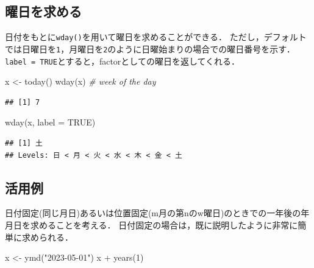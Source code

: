 \documentclass[
]{article}
\newenvironment{Shaded}{\begin{snugshade}}{\end{snugshade}}
\newcommand{\AttributeTok}[1]{\textcolor[rgb]{0.77,0.63,0.00}{#1}}
\newcommand{\CommentTok}[1]{\textcolor[rgb]{0.56,0.35,0.01}{\textit{#1}}}
\newcommand{\ConstantTok}[1]{\textcolor[rgb]{0.00,0.00,0.00}{#1}}
\newcommand{\DecValTok}[1]{\textcolor[rgb]{0.00,0.00,0.81}{#1}}
\newcommand{\FunctionTok}[1]{\textcolor[rgb]{0.00,0.00,0.00}{#1}}
\newcommand{\NormalTok}[1]{#1}
\newcommand{\OtherTok}[1]{\textcolor[rgb]{0.56,0.35,0.01}{#1}}
\newcommand{\SpecialCharTok}[1]{\textcolor[rgb]{0.00,0.00,0.00}{#1}}
\newcommand{\StringTok}[1]{\textcolor[rgb]{0.31,0.60,0.02}{#1}}
\begin{document}
\hypertarget{ux66dcux65e5ux3092ux6c42ux3081ux308b}{%
\subsection{曜日を求める}\label{ux66dcux65e5ux3092ux6c42ux3081ux308b}}

日付をもとに\texttt{wday()}を用いて曜日を求めることができる．
ただし，デフォルトでは日曜日を\texttt{1}，月曜日を\texttt{2}のように日曜始まりの場合での曜日番号を示す．
\texttt{label\ =\ TRUE}とすると，factorとしての曜日を返してくれる．

\begin{Shaded}
\begin{Highlighting}[]
\NormalTok{x }\OtherTok{\textless{}{-}} \FunctionTok{today}\NormalTok{()}
\FunctionTok{wday}\NormalTok{(x) }\CommentTok{\# week of the day}
\end{Highlighting}
\end{Shaded}

\begin{verbatim}
## [1] 7
\end{verbatim}

\begin{Shaded}
\begin{Highlighting}[]
\FunctionTok{wday}\NormalTok{(x, }\AttributeTok{label =} \ConstantTok{TRUE}\NormalTok{)}
\end{Highlighting}
\end{Shaded}

\begin{verbatim}
## [1] 土
## Levels: 日 < 月 < 火 < 水 < 木 < 金 < 土
\end{verbatim}

\hypertarget{ux6d3bux7528ux4f8b}{%
\subsection{活用例}\label{ux6d3bux7528ux4f8b}}

日付固定(同じ月日)あるいは位置固定(m月の第nのw曜日)のときでの一年後の年月日を求めることを考える．
日付固定の場合は，既に説明したように非常に簡単に求められる．

\begin{Shaded}
\begin{Highlighting}[]
\NormalTok{x }\OtherTok{\textless{}{-}} \FunctionTok{ymd}\NormalTok{(}\StringTok{"2023{-}05{-}01"}\NormalTok{)}
\NormalTok{x }\SpecialCharTok{+} \FunctionTok{years}\NormalTok{(}\DecValTok{1}\NormalTok{)}
\end{Highlighting}
\end{Shaded}
\end{document}
